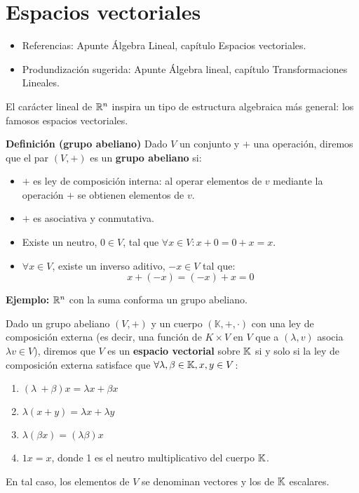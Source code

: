 
\newpage
\section{Espacios vectoriales}

\begin{itemize}	
	\item Referencias: 	Apunte Álgebra Lineal, capítulo Espacios vectoriales. 
	\bigskip 
	\item Produndización sugerida: Apunte Álgebra lineal, capítulo Transformaciones Lineales. 
\end{itemize}

El carácter lineal de $\mathbb{R}^n$ inspira un tipo de estructura algebraica más general: los famosos espacios vectoriales. 

\begin{definicion}
	\textbf{Definición (grupo abeliano)}
	Dado $V$ un conjunto y $+$ una operación, diremos que el par $(V, +)$ es un \textbf{grupo abeliano} si: 
	\begin{itemize}
		\item $+$ es ley de composición interna: al operar elementos de $v$ mediante la operación $+$ se obtienen elementos de $v$. 
		\item $+$ es asociativa y conmutativa. 
		\item Existe un neutro, $0\in V$, tal que $\forall x \in V: x + 0 = 0 + x = x $. 
		\item $\forall x \in V$, existe un inverso aditivo, $-x \in V$ tal que: 
		$$ x + (-x) = (-x) + x = 0 $$ 
	\end{itemize}
\end{definicion}

\begin{ejemplo}
	\textbf{Ejemplo:} $\mathbb{R}^n$ con la suma conforma un grupo abeliano. 
\end{ejemplo}

\begin{definicion}
	Dado un grupo abeliano $(V, +)$ y un cuerpo $(\mathbb{K}, + , \cdot)$ con una ley de composición externa (es decir, una función de $K\times V$ en $V$ que a $(\lambda, v)$ asocia $\lambda v \in V$), diremos que $V$ es un \textbf{espacio vectorial} sobre $\mathbb{K}$ si y solo si la ley de composición externa satisface que $\forall \lambda, \beta \in \mathbb{K}, x, y \in V$: 
	\begin{enumerate}
		\item $(\lambda \ + \beta) x = \lambda x + \beta x$ 
		\item $\lambda (x + y  )=\lambda x + \lambda y $
		\item $\lambda (\beta x) = (\lambda \beta ) x $ 
		\item $ 1 x = x $, donde 1 es el neutro multiplicativo del cuerpo $\mathbb{K}$. 
	\end{enumerate}
	En tal caso, los elementos de $V$ se denominan vectores y los de $\mathbb{K}$ escalares. 
\end{definicion}
	
